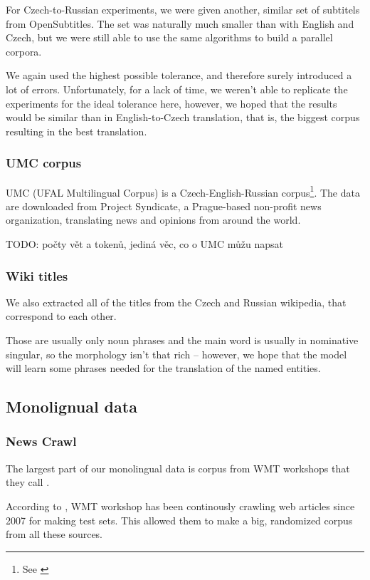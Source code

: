 For Czech-to-Russian experiments, we were given another, similar set of subtitels from OpenSubtitles. The set was naturally much smaller than with English and Czech, but we were still able to use the same algorithms to build a parallel corpora.

We again used the highest possible tolerance, and therefore surely introduced a lot of errors. Unfortunately, for a lack of time, we weren't able to replicate the experiments for the ideal tolerance here, however, we hoped that the results would be similar than in English-to-Czech translation, that is, the biggest corpus resulting in the best translation.

\subsubsection{UMC corpus}
UMC (UFAL Multilingual Corpus) is a Czech-English-Russian corpus\footnote{See \cite{umc}}. The data are downloaded from Project Syndicate, a Prague-based non-profit news organization, translating news and opinions from around the world.

TODO: počty vět a tokenů, jediná věc, co o UMC můžu napsat

\subsubsection{Wiki titles}
We also extracted all of the titles from the Czech and Russian wikipedia, that correspond to each other.

Those are usually only noun phrases and the main word is usually in nominative singular, so the morphology isn't that rich -- however, we hope that the model will learn some phrases needed for the translation of the named entities.

\subsection{Monolignual data}
\subsubsection{News Crawl}
The largest part of our monolingual data is corpus from WMT workshops that they call .

According to \cite{wmt_findings_2009}, WMT workshop has been continously crawling web articles since 2007 for making test sets. This allowed them to make a big, randomized corpus from all these sources.


